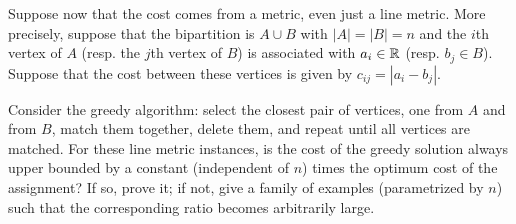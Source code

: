 \documentclass[12pt]{article}
\begin{document}
\begin{exercises}
Suppose now that the cost comes from a  metric, even just a line
metric. More precisely, suppose that the bipartition is $A \cup B$
with $|A|=|B|=n$ and the $i$th vertex of $A$ (resp. the $j$th vertex
of $B$) is associated with $a_i\in {\mathbb R}$ (resp. $b_j\in B$). Suppose
that the cost between these vertices is given by $c_{ij}=|a_i-b_j|$. 

Consider the greedy algorithm: select the closest pair of vertices,
one from $A$ and from $B$, match them together, delete them, and
repeat until all vertices are matched. For these line metric
instances, is the cost of the greedy solution always upper bounded by
a constant (independent of $n$) times the optimum cost of the
assignment? If so, prove it; if not, give a family of examples
(parametrized by $n$) such that the corresponding ratio becomes
arbitrarily large.


\end{exercises}
\end{document}
